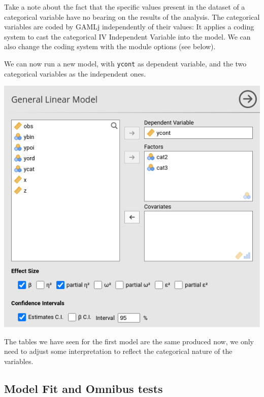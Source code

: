 \documentclass[
]{book}
\begin{document}
Take a note about the fact that the specific values present in the dataset of a categorical variable have no bearing on the results of the analysis. The categorical variables are coded by {GAMLj} independently of their values: It applies a coding system to cast the categorical {IV {Independent Variable} } into the model. We can also change the coding system with the module options (see below).

We can now run a new model, with \texttt{ycont} as dependent variable, and the two categorical variables as the independent ones.

\includegraphics[width=7.94in]{bookletpics/2_anova_input3}

The tables we have seen for the first model are the same produced now, we only need to adjust some interpretation to reflect the categorical nature of the variables.

\hypertarget{model-fit-and-omnibus-tests}{%
\subsection{Model Fit and Omnibus tests}\label{model-fit-and-omnibus-tests}}
\end{document}
